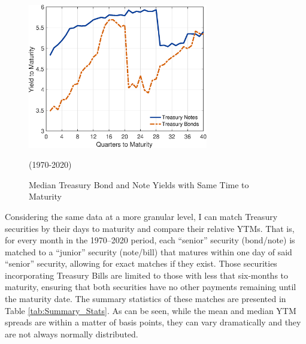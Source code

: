 \documentclass[11pt,a4paper,margin=1.5in]{article}
\begin{document}
\begin{figure}[h]
\centering
\includegraphics[width=0.7\textwidth]{../Figures/BondNote_Spread.eps}
\caption{Median Treasury Bond and Note Yields with Same Time to Maturity}{(1970-2020)}
\label{fig:YTM_Spread}
\end{figure}

Considering the same data at a more granular level, I can match Treasury securities by their days to maturity and compare their relative YTMs.
That is, for every month in the 1970--2020 period, each ``senior'' security (bond/note) is matched to a ``junior'' security (note/bill) that matures within one day of said ``senior'' security, allowing for exact matches if they exist.
Those securities incorporating Treasury Bills are limited to those with less that six-months to maturity, ensuring that both securities have no other payments remaining until the maturity date.
The summary statistics of these matches are presented in Table \ref{tab:Summary_Stats}.
As can be seen, while the mean and median YTM spreads are within a matter of basis points, they can vary dramatically and they are not always normally distributed.
\end{document}
